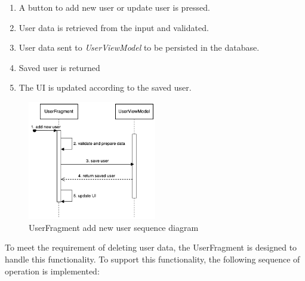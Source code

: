 \begin{enumerate}
    \item A button to add new user or update user is pressed.
    \item User data is retrieved from the input and validated.
    \item User data sent to \emph{UserViewModel} to be persisted in the database.
    \item Saved user is returned
    \item The UI is updated according to the saved user.
\end{enumerate}

\begin{figure}[H]
    \centering
    \includegraphics[width=0.5\textwidth]{diagrams/create-user-seq.drawio.png}
    \caption{UserFragment add new user sequence diagram}
    \label{fig:userfragment_add new user}
\end{figure}

To meet the requirement of deleting user data, the UserFragment is designed to handle this functionality. 
To support this functionality, the following sequence of operation is implemented:
